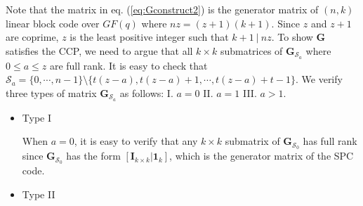 \documentclass[journal,twocolumn]{IEEEtran}
\theoremstyle{definition}
\newcommand{\calS}{\mathcal{S}}
\newcommand{\bfG}{\mathbf{G}}
\newcommand{\bfI}{\mathbf{I}}
\newcommand{\bfoe}{\mathbf{1}}
\begin{document}
Note that the matrix in eq. (\ref{eq:Gconstruct2}) is the generator matrix of $(n,k)$ linear block code over $GF(q)$ where $nz=(z+1)(k+1)$. Since $z$ and $z+1$ are coprime, $z$ is the least positive integer such that $k+1~|~nz$. To show $\bfG$ satisfies the CCP, we need to argue that all $k\times k$ submatrices of $\bfG_{\calS_a}$ where $0\le a\le z$ are full rank. It is easy to check that $\calS_a=\{0,\cdots, n-1\}\setminus \{t(z-a),t(z-a)+1,\cdots,t(z-a)+t-1\}$. We verify three types of matrix $\bfG_{\calS_a}$ as follows: I. $a=0$ II. $a=1$ III. $a>1$.
\begin{itemize}
	\item Type I
	
	When $a=0$, it is easy to verify that any $k\times k$ submatrix of $\bfG_{\calS_0}$ has full rank since $\bfG_{\calS_0}$ has the form $[\bfI_{k\times k}|\bfoe_k]$, which is the generator matrix of the SPC code.
	
	\item Type II
	

\end{itemize}
\end{document}
